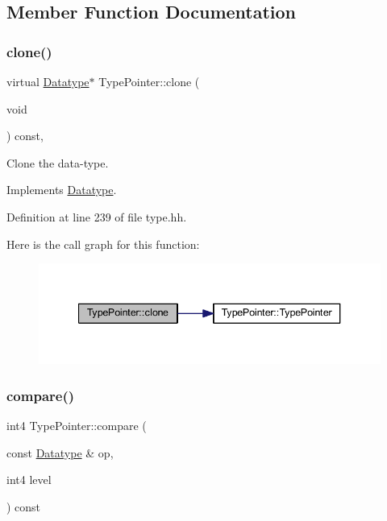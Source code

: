 \subsection{Member Function Documentation}
\mbox{\label{class_type_pointer_acb36f99677bfbe269f7bfca663f81618}} 
\subsubsection{\texorpdfstring{clone()}{clone()}}
{\footnotesize\ttfamily virtual \mbox{\hyperlink{class_datatype}{Datatype}}$\ast$ Type\+Pointer\+::clone (\begin{DoxyParamCaption}\item[{void}]{ }\end{DoxyParamCaption}) const\hspace{0.3cm}{\ttfamily [inline]}, {\ttfamily [virtual]}}



Clone the data-\/type. 



Implements \mbox{\hyperlink{class_datatype_a6bd032d91f40efe36841adc85b3ff0ec}{Datatype}}.



Definition at line 239 of file type.\+hh.

Here is the call graph for this function\+:
\nopagebreak
\begin{figure}[H]
\begin{center}
\leavevmode
\includegraphics[width=340pt]{class_type_pointer_acb36f99677bfbe269f7bfca663f81618_cgraph}
\end{center}
\end{figure}
\mbox{\label{class_type_pointer_aba4a7c8c334a37a2225ec32c7328e402}} 
\subsubsection{\texorpdfstring{compare()}{compare()}}
{\footnotesize\ttfamily int4 Type\+Pointer\+::compare (\begin{DoxyParamCaption}\item[{const \mbox{\hyperlink{class_datatype}{Datatype}} \&}]{op,  }\item[{int4}]{level }\end{DoxyParamCaption}) const\hspace{0.3cm}{\ttfamily [virtual]}}



